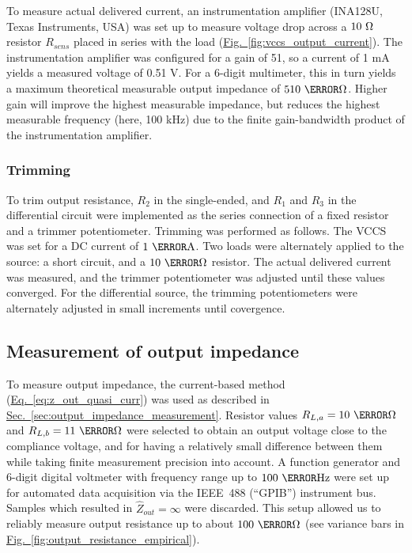 \documentclass[conference]{IEEEtran}
\newcommand{\briefeqlink}[1]{\hyperref[#1]{Eq.~\ref*{#1}}\xspace }
\newcommand{\briefseclink}[1]{\hyperref[#1]{Sec.~\ref*{#1}}}
\newcommand{\brieffiglink}[1]{\hyperref[#1]{Fig.~\ref*{#1}}}
\begin{document}
To measure actual delivered current, an instrumentation amplifier (INA128U, Texas Instruments, USA) was set up to measure voltage drop across a $10~\ohm$ resistor $R_{sens}$ placed in series with the load (\brieffiglink{fig:vccs_output_current}). The instrumentation amplifier was configured for a gain of 51, so a current of 1 mA yields a measured voltage of 0.51 V. For a 6-digit multimeter, this in turn yields a maximum theoretical measurable output impedance of $510~\mega\ohm$. Higher gain will improve the highest measurable impedance, but reduces the highest measurable frequency (here, 100 kHz) due to the finite gain-bandwidth product of the instrumentation amplifier.


\subsubsection{Trimming}

To trim output resistance, $R_2$ in the single-ended, and $R_1$ and $R_3$ in the differential circuit were implemented as the series connection of a fixed resistor and a trimmer potentiometer. Trimming was performed as follows. The VCCS was set for a DC current of $1~\milli\ampere$. Two loads were alternately applied to the source: a short circuit, and a $10~\kilo\ohm$ resistor. The actual delivered current was measured, and the trimmer potentiometer was adjusted until these values converged. For the differential source, the trimming potentiometers were alternately adjusted in small increments until covergence.


\subsection{Measurement of output impedance}
\label{sec:empirical_output_resistance}

To measure output impedance, the current-based method (\briefeqlink{eq:z_out_quasi_curr}) was used as described in \briefseclink{sec:output_impedance_measurement}. Resistor values $R_{L,a}=10~\kilo\ohm$ and $R_{L,b}=11~\kilo\ohm$ were selected to obtain an output voltage close to the compliance voltage, and for having a relatively small difference between them while taking finite measurement precision into account. A function generator and 6-digit digital voltmeter with frequency range up to $100~\kilo\hertz$ were set up for automated data acquisition via the IEEE~488 (``GPIB'') instrument bus. Samples which resulted in $\hat{Z}_{out}=\infty$ were discarded. This setup allowed us to reliably measure output resistance up to about $100~\mega\ohm$ (see variance bars in \brieffiglink{fig:output_resistance_empirical}).
\end{document}
